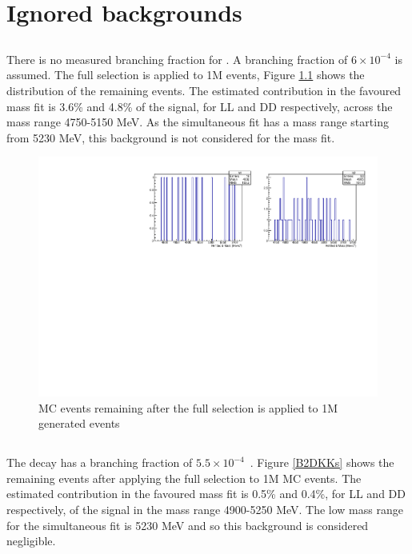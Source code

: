 \chapter{\label{sec:app:ignoredbackgrounds}Ignored backgrounds}

\minitoc

\section{\decay{\B}{\D\Kstar\piz}}

There is no measured branching fraction for \decay{\B}{\D\Kstar\piz}. A \decay{\B}{\D\Kstar\piz} branching fraction of $6 \times 10^{-4}$ is assumed. The full selection is applied to 1M \decay{\B}{\D\Kstar\piz} events, Figure \ref{B2DKstPi0} shows the distribution of the remaining events. The estimated contribution in the favoured \decay{\B}{\D(\kaon\pi)\Kstar} mass fit is 3.6\% and 4.8\% of the signal, for LL and DD respectively, across the mass range 4750-5150 MeV. As the simultaneous fit has a mass range starting from 5230 MeV, this background is not considered for the mass fit.

\begin{figure}[h]
\centering
\includegraphics[width=0.7\linewidth]{figures/backgrounds/B2DKstPi0.pdf}
\caption{\decay{\B}{\D\Kstar\piz} MC events remaining after the full selection is applied to 1M generated events}
\label{B2DKstPi0}
\end{figure}

\section{\decay{\B}{\D\KS\kaon}}

The decay \decay{\B}{\D\KS\kaon} has a branching fraction of $5.5 \times 10^{-4}$~\cite{PDG2014}. Figure \ref{B2DKKs} shows the remaining events after applying the full selection to 1M \decay{\B}{\D\KS\kaon} MC events. The estimated contribution in the favoured \decay{\B}{\D(\kaon\pi)\Kstar} mass fit is 0.5\% and 0.4\%, for LL and DD respectively, of the signal in the mass range 4900-5250 MeV. The low mass range for the simultaneous fit is 5230 MeV and so this background is considered negligible.

